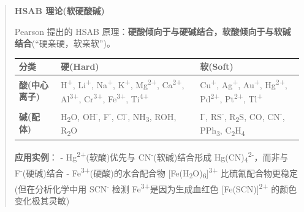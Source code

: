 \begin{quote}
\textbf{HSAB 理论(软硬酸碱)}

Pearson 提出的 HSAB 原理：\textbf{硬酸倾向于与硬碱结合，软酸倾向于与软碱结合}(``硬亲硬，软亲软'')。

{\def\LTcaptype{none} %
\begin{longtable}[]{@{}
  >{\raggedright\arraybackslash}p{}
  >{\raggedright\arraybackslash}p{}
  >{\raggedright\arraybackslash}p{}@{}}
\toprule\noalign{}
\begin{minipage}[b]{\linewidth}\raggedright
分类
\end{minipage} & \begin{minipage}[b]{\linewidth}\raggedright
硬(Hard)
\end{minipage} & \begin{minipage}[b]{\linewidth}\raggedright
软(Soft)
\end{minipage} \\
\midrule\noalign{}
\endhead
\bottomrule\noalign{}
\endlastfoot
\textbf{酸(中心离子)} & H\textsuperscript{+}, Li\textsuperscript{+}, Na\textsuperscript{+}, K\textsuperscript{+}, Mg\textsuperscript{2+}, Ca\textsuperscript{2+}, Al\textsuperscript{3+}, Cr\textsuperscript{3+}, Fe\textsuperscript{3+}, Ti\textsuperscript{4+} & Cu\textsuperscript{+}, Ag\textsuperscript{+}, Au\textsuperscript{+}, Hg\textsuperscript{2+}, Pd\textsuperscript{2+}, Pt\textsuperscript{2+}, Tl\textsuperscript{+} \\
\textbf{碱(配体)} & H\textsubscript{2}O, OH\textsuperscript{-}, F\textsuperscript{-}, Cl\textsuperscript{-}, NH\textsubscript{3}, ROH, R\textsubscript{2}O & I\textsuperscript{-}, RS\textsuperscript{-}, R\textsubscript{2}S, CO, CN\textsuperscript{-}, PPh\textsubscript{3}, C\textsubscript{2}H\textsubscript{4} \\
\end{longtable}
}

\textbf{应用实例}：
- Hg\textsuperscript{2+}(软酸)优先与 CN\textsuperscript{-}(软碱)结合形成 Hg(CN)\textsubscript{4}\textsuperscript{2-}，而非与 F\textsuperscript{-}(硬碱)结合
- Fe\textsuperscript{3+}(硬酸)的水合配合物 {[}Fe(H\textsubscript{2}O)\textsubscript{6}{]}\textsuperscript{3+} 比硫氰配合物更稳定(但在分析化学中用 SCN\textsuperscript{-} 检测 Fe\textsuperscript{3+}是因为生成血红色 {[}Fe(SCN){]}\textsuperscript{2+} 的颜色变化极其灵敏)
\end{quote}

